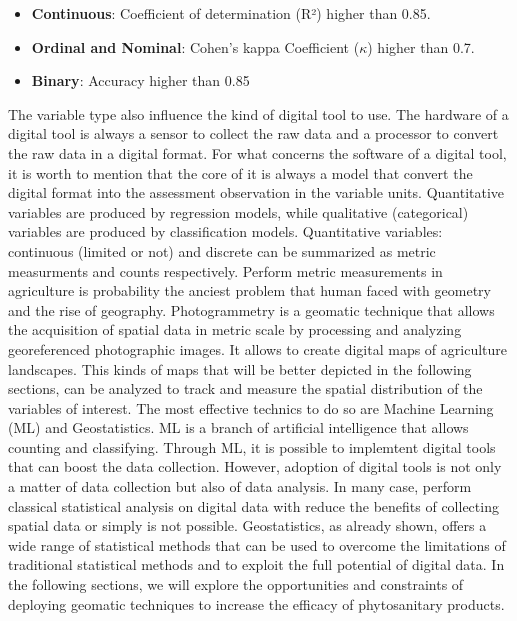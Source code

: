 \documentclass[12pt,a4paper,oneside]{report}
\begin{document}
\begin{itemize}
    \item \textbf{Continuous}: Coefficient of determination (R²) higher than 0.85.
    \item \textbf{Ordinal and Nominal}: Cohen's kappa Coefficient ($\kappa$) higher than 0.7.
    \item \textbf{Binary}: Accuracy higher than 0.85
\end{itemize}

The variable type also influence the kind of digital tool to use.
The hardware of a digital tool is always a sensor to collect the raw data and a
processor to convert the raw data in a digital format.
For what concerns the software of a digital tool, it is worth to mention that
the core of it is always a model that convert the digital format into the assessment
observation in the variable units.
Quantitative variables are produced by regression models, while qualitative (categorical) 
variables are produced by classification models. 
Quantitative variables: continuous (limited or not) and discrete
can be summarized as metric measurments and counts respectively. 
Perform metric measurements in agriculture is probability the anciest
problem that human faced with geometry and the rise of geography. 
Photogrammetry is a geomatic technique that allows the acquisition of spatial
data in metric scale by processing and analyzing georeferenced photographic images.
It allows to create digital maps of agriculture landscapes. This kinds of maps
that will be better depicted in the following sections, can be analyzed to
track and measure the spatial distribution of the variables of interest.
The most effective technics to do so are Machine Learning (ML) and Geostatistics.
ML is a branch of artificial intelligence
that allows counting and classifying.
Through ML, it is possible to implemtent 
digital tools that can boost the data collection.
However, adoption of digital tools is not only a matter of data collection but also of data
analysis. In many case, perform classical statistical analysis on digital data with 
reduce the benefits of collecting spatial data or simply is not possible. 
Geostatistics, as already shown, offers a wide range of statistical methods that 
can be used to
overcome the limitations of traditional statistical methods and to exploit the
full potential of digital data.
In the following sections, we will explore the opportunities and constraints of
deploying geomatic techniques to increase the efficacy of phytosanitary products.
\end{document}
